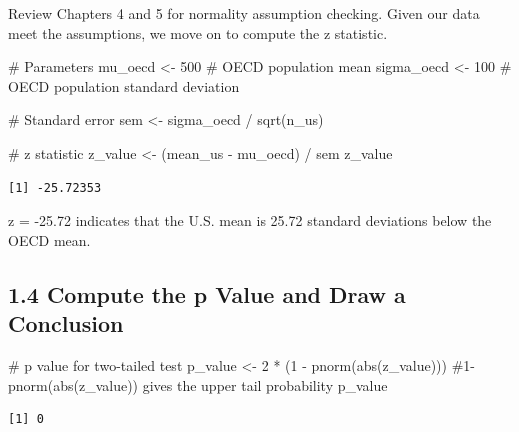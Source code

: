 \documentclass[
  letterpaper,
  DIV=11,
  numbers=noendperiod]{scrreprt}
\newenvironment{Shaded}{\begin{snugshade}}{\end{snugshade}}
\newcommand{\CommentTok}[1]{\textcolor[rgb]{0.37,0.37,0.37}{#1}}
\newcommand{\DecValTok}[1]{\textcolor[rgb]{0.68,0.00,0.00}{#1}}
\newcommand{\FunctionTok}[1]{\textcolor[rgb]{0.28,0.35,0.67}{#1}}
\newcommand{\NormalTok}[1]{\textcolor[rgb]{0.00,0.23,0.31}{#1}}
\newcommand{\OtherTok}[1]{\textcolor[rgb]{0.00,0.23,0.31}{#1}}
\newcommand{\SpecialCharTok}[1]{\textcolor[rgb]{0.37,0.37,0.37}{#1}}
\begin{document}
Review Chapters 4 and 5 for normality assumption checking. Given our
data meet the assumptions, we move on to compute the z statistic.

\begin{Shaded}
\begin{Highlighting}[]
\CommentTok{\# Parameters }
\NormalTok{mu\_oecd }\OtherTok{\textless{}{-}} \DecValTok{500}      \CommentTok{\# OECD population mean }
\NormalTok{sigma\_oecd }\OtherTok{\textless{}{-}} \DecValTok{100}   \CommentTok{\# OECD population standard deviation }
 
\CommentTok{\# Standard error }
\NormalTok{sem }\OtherTok{\textless{}{-}}\NormalTok{ sigma\_oecd }\SpecialCharTok{/} \FunctionTok{sqrt}\NormalTok{(n\_us) }
 
\CommentTok{\# z statistic }
\NormalTok{z\_value }\OtherTok{\textless{}{-}}\NormalTok{ (mean\_us }\SpecialCharTok{{-}}\NormalTok{ mu\_oecd) }\SpecialCharTok{/}\NormalTok{ sem }
\NormalTok{z\_value }
\end{Highlighting}
\end{Shaded}

\begin{verbatim}
[1] -25.72353
\end{verbatim}

z = -25.72 indicates that the U.S. mean is 25.72 standard deviations
below the OECD mean.

\subsection*{1.4 Compute the p Value and Draw a
Conclusion}\label{compute-the-p-value-and-draw-a-conclusion}

\begin{Shaded}
\begin{Highlighting}[]
\CommentTok{\# p value for two{-}tailed test }
\NormalTok{p\_value }\OtherTok{\textless{}{-}} \DecValTok{2} \SpecialCharTok{*}\NormalTok{ (}\DecValTok{1} \SpecialCharTok{{-}} \FunctionTok{pnorm}\NormalTok{(}\FunctionTok{abs}\NormalTok{(z\_value))) }\CommentTok{\#1{-}pnorm(abs(z\_value)) gives the upper tail probability  }
\NormalTok{p\_value }
\end{Highlighting}
\end{Shaded}

\begin{verbatim}
[1] 0
\end{verbatim}
\end{document}

